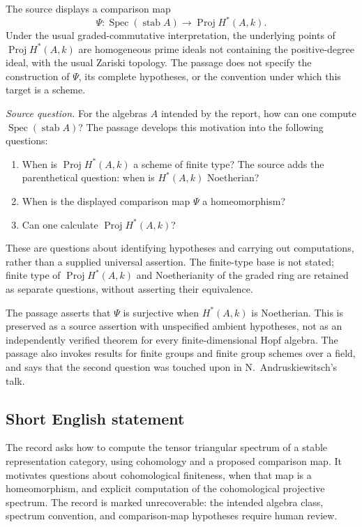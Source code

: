 \documentclass[11pt]{article}
\begin{document}
The source displays a comparison map
\[
\Psi:\operatorname{Spec}(\operatorname{stab}A)
 \longrightarrow\operatorname{Proj}H^*(A,k).
\]
Under the usual graded-commutative interpretation, the underlying points of \(\operatorname{Proj}H^*(A,k)\) are homogeneous prime ideals not containing the positive-degree ideal, with the usual Zariski topology. The passage does not specify the construction of \(\Psi\), its complete hypotheses, or the convention under which this target is a scheme.

\emph{Source question.} For the algebras \(A\) intended by the report, how can one compute \(\operatorname{Spec}(\operatorname{stab}A)\)? The passage develops this motivation into the following questions:
\begin{enumerate}
\item When is \(\operatorname{Proj}H^*(A,k)\) a scheme of finite type? The source adds the parenthetical question: when is \(H^*(A,k)\) Noetherian?
\item When is the displayed comparison map \(\Psi\) a homeomorphism?
\item Can one calculate \(\operatorname{Proj}H^*(A,k)\)?
\end{enumerate}
These are questions about identifying hypotheses and carrying out computations, rather than a supplied universal assertion. The finite-type base is not stated; finite type of \(\operatorname{Proj}H^*(A,k)\) and Noetherianity of the graded ring are retained as separate questions, without asserting their equivalence.

The passage asserts that \(\Psi\) is surjective when \(H^*(A,k)\) is Noetherian. This is preserved as a source assertion with unspecified ambient hypotheses, not as an independently verified theorem for every finite-dimensional Hopf algebra. The passage also invokes results for finite groups and finite group schemes over a field, and says that the second question was touched upon in N.~Andruskiewitsch's talk.
\subsection{Short English statement}
The record asks how to compute the tensor triangular spectrum of a stable representation category, using cohomology and a proposed comparison map. It motivates questions about cohomological finiteness, when that map is a homeomorphism, and explicit computation of the cohomological projective spectrum. The record is marked unrecoverable: the intended algebra class, spectrum convention, and comparison-map hypotheses require human review.
\end{document}
